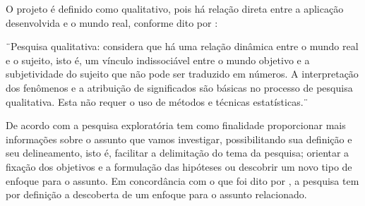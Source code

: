 O projeto é definido como qualitativo, pois há relação direta entre
a aplicação desenvolvida e o mundo real,
conforme dito por \textcite{prodanov2013}:

\begin{sidecite}
    ¨Pesquisa qualitativa: considera que há uma relação dinâmica
    entre o mundo real e o sujeito, isto é, um vínculo indissociável
    entre o mundo objetivo e a subjetividade do sujeito que não pode
    ser traduzido em números.
    A interpretação dos fenômenos e a atribuição de significados são
    básicas no processo de pesquisa qualitativa.
    Esta não requer o uso de métodos e técnicas estatísticas.¨\cite[p.~70]{prodanov2013}
\end{sidecite}

De acordo com \textcite{prodanov2013} a pesquisa exploratória tem
como finalidade proporcionar mais informações sobre o assunto que
vamos investigar, possibilitando sua definição e seu delineamento,
isto é, facilitar a delimitação do tema da pesquisa; orientar a
fixação dos objetivos e a formulação das hipóteses ou descobrir um
novo tipo de enfoque para o assunto.
Em concordância com o que foi dito por \textcite{prodanov2013}, a
pesquisa tem por definição a descoberta de um enfoque para o assunto
relacionado.

